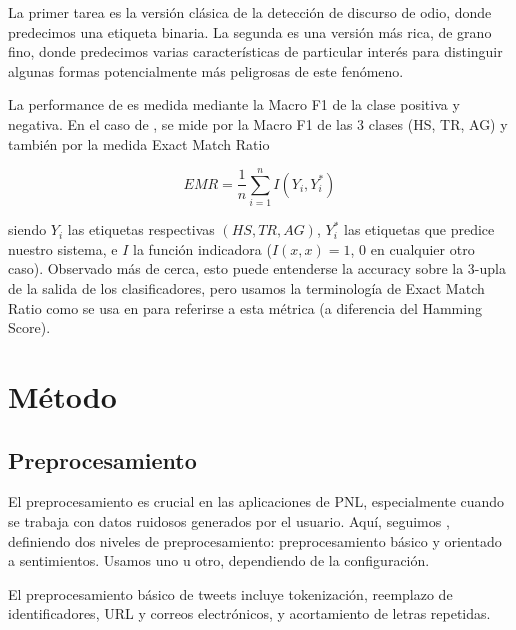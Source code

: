 
La primer tarea es la versión clásica de la detección de discurso de odio, donde predecimos una etiqueta binaria. La segunda es una versión más rica, de grano fino, donde predecimos varias características de particular interés para distinguir algunas formas potencialmente más peligrosas de este fenómeno.

La performance de \subtaska{} es medida mediante la Macro F1 de la clase positiva y negativa. En el caso de \subtaskb{}, se mide por la Macro F1 de las 3 clases (HS, TR, AG) y también por la medida Exact Match Ratio

\begin{equation*}
    EMR = \frac{1}{n} \sum\limits_{i=1}^{n} I(Y_i, Y_i^*)
\end{equation*}

siendo $Y_i$ las etiquetas respectivas $(HS, TR, AG)$, $Y_i^*$ las etiquetas que predice nuestro sistema, e  $I$ la función indicadora ($I(x, x) = 1$, $0$ en cualquier otro caso). Observado más de cerca, esto puede entenderse la accuracy sobre la 3-upla de la salida de los clasificadores, pero usamos la terminología de Exact Match Ratio como se usa en \citet{zhang-2014-multilabel} para referirse a esta métrica (a diferencia del Hamming Score).

\section{Método}

\subsection {Preprocesamiento}


\newcommand{\elmo}[0]{ELMo}
\newcommand{\elmomodel}[0]{\emph{LSTM-\elmo{}}}
\newcommand{\bow}[0]{BoW}
\newcommand{\boc}[0]{BoC}
\newcommand{\elmobowmodel}[0]{\emph{LSTM-\elmo{}+\bow{}}}
\newcommand{\svmmodel}[0]{$\mathrm{SVM}_0$}
\newcommand{\hateval}[0]{HatEval}
\newcommand{\semeval}[0]{SemEval-2019}
\newcommand{\fasttext}[0]{\emph{fastText}}

El preprocesamiento es crucial en las aplicaciones de PNL, especialmente cuando se trabaja con datos ruidosos generados por el usuario. Aquí, seguimos \citet{atalaya_tass2018}, definiendo dos niveles de preprocesamiento: preprocesamiento básico y orientado a sentimientos. Usamos uno u otro, dependiendo de la configuración.

El preprocesamiento básico de tweets incluye tokenización, reemplazo de identificadores, URL y correos electrónicos, y acortamiento de letras repetidas.

